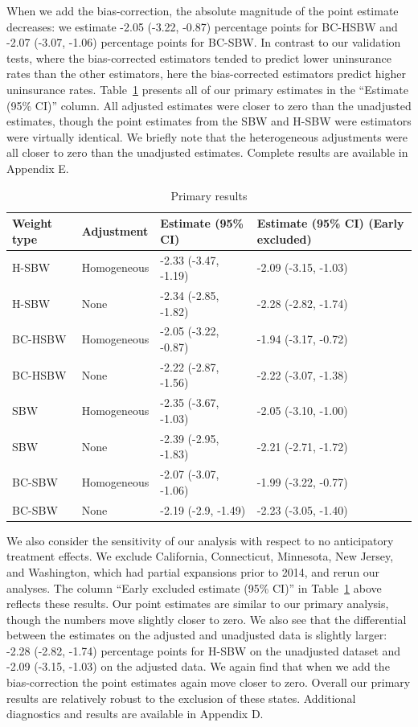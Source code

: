 \documentclass[aoas]{imsart}
\theoremstyle{plain}
\theoremstyle{remark}
\begin{document}
When we add the bias-correction, the absolute magnitude of the point estimate decreases: we estimate -2.05 (-3.22, -0.87) percentage points for BC-HSBW and -2.07 (-3.07, -1.06) percentage points for BC-SBW. In contrast to our validation tests, where the bias-corrected estimators tended to predict lower uninsurance rates than the other estimators, here the bias-corrected estimators predict higher uninsurance rates. Table~\ref{tab:mainresults} presents all of our primary estimates in the ``Estimate (95\% CI)'' column. All adjusted estimates were closer to zero than the unadjusted estimates, though the point estimates from the SBW and H-SBW were estimators were virtually identical. We briefly note that the heterogeneous adjustments were all closer to zero than the unadjusted estimates. Complete results are available in Appendix E.

\begin{table}[ht]\label{tab:mainresults}
\caption{Primary results}
\begin{tabular}{llll}
  \hline
Weight type & Adjustment & Estimate (95\% CI) & Estimate (95\% CI) (Early excluded) \\ 
  \hline
H-SBW & Homogeneous & -2.33 (-3.47, -1.19) & -2.09 (-3.15, -1.03) \\ 
  H-SBW & None & -2.34 (-2.85, -1.82) & -2.28 (-2.82, -1.74) \\ 
  BC-HSBW & Homogeneous & -2.05 (-3.22, -0.87) & -1.94 (-3.17, -0.72) \\ 
  BC-HSBW & None & -2.22 (-2.87, -1.56) & -2.22 (-3.07, -1.38) \\ 
  SBW & Homogeneous & -2.35 (-3.67, -1.03) & -2.05 (-3.10, -1.00) \\ 
  SBW & None & -2.39 (-2.95, -1.83) & -2.21 (-2.71, -1.72) \\ 
  BC-SBW & Homogeneous & -2.07 (-3.07, -1.06) & -1.99 (-3.22, -0.77) \\ 
  BC-SBW & None & -2.19 (-2.9, -1.49) & -2.23 (-3.05, -1.40) \\ 
   \hline
\end{tabular}
\end{table}

We also consider the sensitivity of our analysis with respect to no anticipatory treatment effects. We exclude California, Connecticut, Minnesota, New Jersey, and Washington, which had partial expansions prior to 2014, and rerun our analyses. The column ``Early excluded estimate (95\% CI)'' in Table~\ref{tab:mainresults} above reflects these results. Our point estimates are similar to our primary analysis, though the numbers move slightly closer to zero. We also see that the differential between the estimates on the adjusted and unadjusted data is slightly larger: -2.28 (-2.82, -1.74) percentage points for H-SBW on the unadjusted dataset and -2.09 (-3.15, -1.03) on the adjusted data. We again find that when we add the bias-correction the point estimates again move closer to zero. Overall our primary results are relatively robust to the exclusion of these states. Additional diagnostics and results are available in Appendix D.
\end{document}
